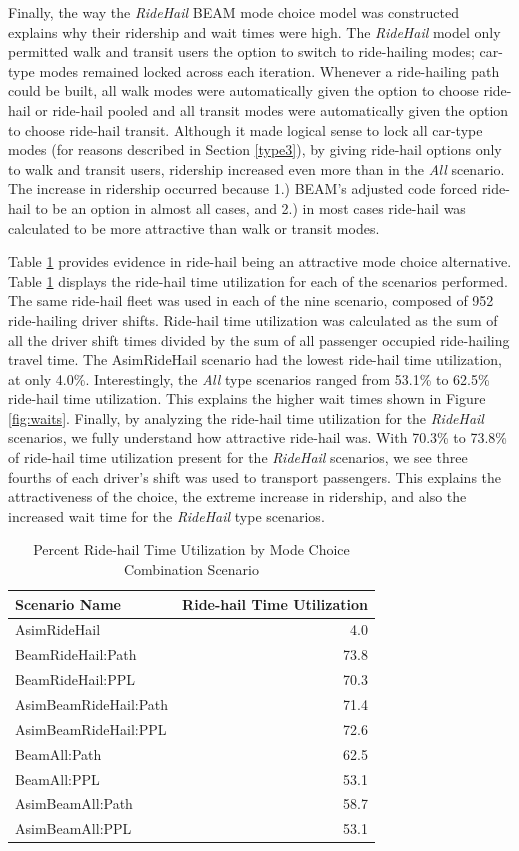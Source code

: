 \documentclass[fancy, masters]{byuthesis}
\begin{document}
Finally, the way the \emph{RideHail} BEAM mode choice model was constructed explains why their ridership and wait times were high. The \emph{RideHail} model only permitted walk and transit users the option to switch to ride-hailing modes; car-type modes remained locked across each iteration. Whenever a ride-hailing path could be built, all walk modes were automatically given the option to choose ride-hail or ride-hail pooled and all transit modes were automatically given the option to choose ride-hail transit. Although it made logical sense to lock all car-type modes (for reasons described in Section \ref{type3}), by giving ride-hail options only to walk and transit users, ridership increased even more than in the \emph{All} scenario. The increase in ridership occurred because 1.) BEAM's adjusted code forced ride-hail to be an option in almost all cases, and 2.) in most cases ride-hail was calculated to be more attractive than walk or transit modes.

Table \ref{tab:timeutil} provides evidence in ride-hail being an attractive mode choice alternative. Table \ref{tab:timeutil} displays the ride-hail time utilization for each of the scenarios performed. The same ride-hail fleet was used in each of the nine scenario, composed of 952 ride-hailing driver shifts. Ride-hail time utilization was calculated as the sum of all the driver shift times divided by the sum of all passenger occupied ride-hailing travel time. The AsimRideHail scenario had the lowest ride-hail time utilization, at only 4.0\%. Interestingly, the \emph{All} type scenarios ranged from 53.1\% to 62.5\% ride-hail time utilization. This explains the higher wait times shown in Figure \ref{fig:waits}. Finally, by analyzing the ride-hail time utilization for the \emph{RideHail} scenarios, we fully understand how attractive ride-hail was. With 70.3\% to 73.8\% of ride-hail time utilization present for the \emph{RideHail} scenarios, we see three fourths of each driver's shift was used to transport passengers. This explains the attractiveness of the choice, the extreme increase in ridership, and also the increased wait time for the \emph{RideHail} type scenarios.

\begin{table}

\caption{\label{tab:timeutil}Percent Ride-hail Time Utilization by Mode Choice Combination Scenario}
\centering
\begin{tabular}[t]{lr}
\toprule
Scenario Name & Ride-hail Time Utilization\\
\midrule
AsimRideHail & 4.0\\
BeamRideHail:Path & 73.8\\
BeamRideHail:PPL & 70.3\\
AsimBeamRideHail:Path & 71.4\\
AsimBeamRideHail:PPL & 72.6\\
\addlinespace
BeamAll:Path & 62.5\\
BeamAll:PPL & 53.1\\
AsimBeamAll:Path & 58.7\\
AsimBeamAll:PPL & 53.1\\
\bottomrule
\end{tabular}
\end{table}
\end{document}
